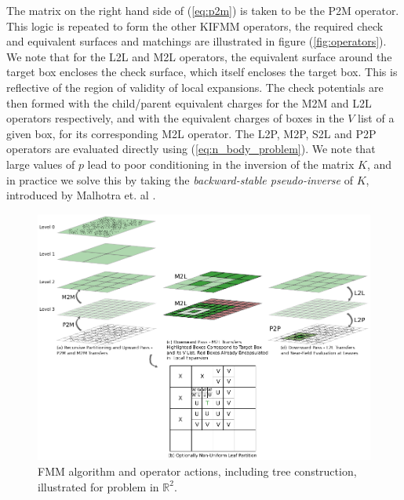 \documentclass{IEEEcsmag}
\begin{document}
The matrix on the right hand side of (\ref{eq:p2m}) is taken to be the P2M operator. This logic is repeated to form the other KIFMM operators, the required check and equivalent surfaces and matchings are illustrated in figure (\ref{fig:operators}). We note that for the L2L and M2L operators, the equivalent surface around the target box encloses the check surface, which itself encloses the target box. This is reflective of the region of validity of local expansions. The check potentials are then formed with the child/parent equivalent charges for the M2M and L2L operators respectively, and with the equivalent charges of boxes in the $V$ list of a given box, for its corresponding M2L operator. The L2P, M2P, S2L and P2P operators are evaluated directly using (\ref{eq:n_body_problem}). We note that large values of $p$ lead to poor conditioning in the inversion of the matrix $K$, and in practice we solve this by taking the \textit{backward-stable pseudo-inverse} of $K$, introduced by Malhotra et. al \cite{Malhotra2015}.

\begin{figure}
	\centerline{\includegraphics {figures/tree.pdf}}
	\caption{FMM algorithm and operator actions, including tree construction, illustrated for problem in $\mathbb{R}^2$.}
	\label{fig:algorithm}
\end{figure}
\end{document}
